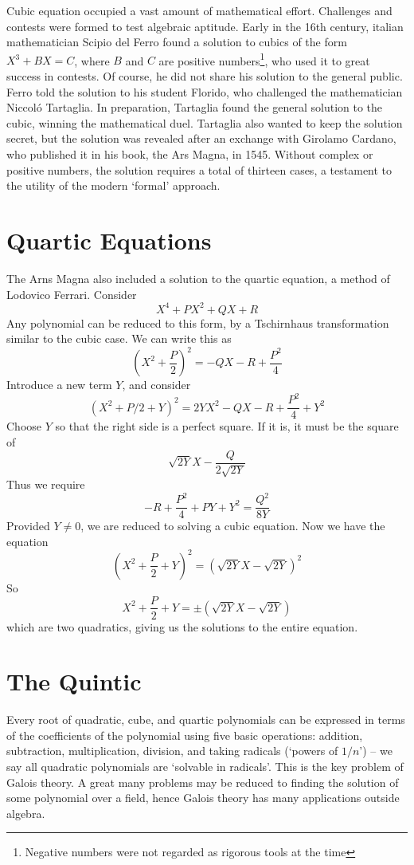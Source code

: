 Cubic equation occupied a vast amount of mathematical effort. Challenges and contests were formed to test algebraic aptitude. Early in the 16th century, italian mathematician Scipio del Ferro found a solution to cubics of the form $X^3 + BX = C$, where $B$ and $C$ are positive numbers\footnote{Negative numbers were not regarded as rigorous tools at the time}, who used it to great success in contests. Of course, he did not share his solution to the general public. Ferro told the solution to his student Florido, who challenged the mathematician Niccol\'{o} Tartaglia. In preparation, Tartaglia found the general solution to the cubic, winning the mathematical duel. Tartaglia also wanted to keep the solution secret, but the solution was revealed after an exchange with Girolamo Cardano, who published it in his book, the Ars Magna, in 1545. Without complex or positive numbers, the solution requires a total of thirteen cases, a testament to the utility of the modern `formal' approach.

\section{Quartic Equations}

The Arns Magna also included a solution to the quartic equation, a method of Lodovico Ferrari. Consider
%
\[ X^4 + PX^2 + QX + R \]
%
Any polynomial can be reduced to this form, by a Tschirnhaus transformation similar to the cubic case. We can write this as
%
\[ (X^2 + \frac{P}{2})^2 = -QX - R + \frac{P^2}{4} \]
%
Introduce a new term $Y$, and consider
%
\[ (X^2 + P/2 + Y)^2 = 2YX^2 - QX - R + \frac{P^2}{4} + Y^2 \]
%
Choose $Y$ so that the right side is a perfect square. If it is, it must be the square of
%
\[ \sqrt{2Y}X - \frac{Q}{2\sqrt{2Y}} \]
%
Thus we require
%
\[ -R + \frac{P^2}{4} + PY + Y^2 = \frac{Q^2}{8Y} \]
%
Provided $Y \neq 0$, we are reduced to solving a cubic equation. Now we have the equation
%
\[ (X^2 + \frac{P}{2} + Y)^2 = (\sqrt{2Y}X - \sqrt{2Y})^2 \]
%
So
%
\[ X^2 + \frac{P}{2} + Y = \pm(\sqrt{2Y}X - \sqrt{2Y}) \]
%
which are two quadratics, giving us the solutions to the entire equation.

\section{The Quintic}

Every root of quadratic, cube, and quartic polynomials can be expressed in terms of the coefficients of the polynomial using five basic operations: addition, subtraction, multiplication, division, and taking radicals (`powers of $1/n$') -- we say all quadratic polynomials are `solvable in radicals'. This is the key problem of Galois theory. A great many problems may be reduced to finding the solution of some polynomial over a field, hence Galois theory has many applications outside algebra.

